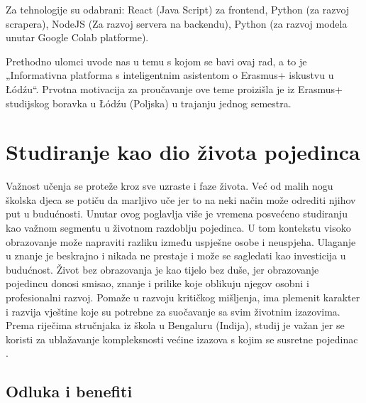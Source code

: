 \documentclass[]{foi}
\begin{document}
Za tehnologije su odabrani: React (Java Script) za frontend, Python (za razvoj scrapera), NodeJS (Za razvoj servera na backendu), 
Python (za razvoj modela unutar Google Colab platforme). 

Prethodno ulomci uvode nas u temu s kojom se bavi ovaj rad, a to je „Informativna platforma s inteligentnim asistentom o Erasmus+ 
iskustvu u Łódźu“. Prvotna motivacija za proučavanje ove teme proizišla je iz Erasmus+ studijskog boravka u Łódźu (Poljska) u trajanju jednog semestra.



\chapter{Studiranje kao dio života pojedinca}

Važnost učenja se proteže kroz sve uzraste i faze života. Već od malih nogu školska djeca se potiču da marljivo uče jer to na neki način može odrediti njihov put u budućnosti.
Unutar ovog poglavlja više je vremena posvećeno studiranju kao važnom segmentu u životnom razdoblju pojedinca. U tom kontekstu visoko obrazovanje može napraviti razliku između uspješne osobe
i neuspjeha. Ulaganje u znanje je beskrajno i nikada ne prestaje i može se sagledati kao investicija u budućnost. Život bez obrazovanja je kao tijelo bez duše, jer obrazovanje pojedincu donosi smisao, 
znanje i prilike koje oblikuju njegov osobni i profesionalni razvoj. Pomaže u razvoju kritičkog mišljenja, ima plemenit karakter i razvija vještine koje su potrebne za suočavanje sa svim životnim izazovima. 
Prema riječima stručnjaka iz škola u Bengaluru (Indija), studij je važan jer se koristi za ublažavanje kompleksnosti većine izazova s kojim se susretne pojedinac \cite{digital3602025studies}. 



\section{Odluka i benefiti}
\end{document}
